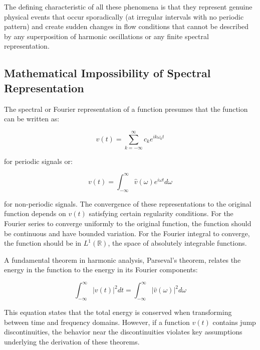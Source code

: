 ﻿\documentclass[a4paper,11pt]{article}
\theoremstyle{definition}
\begin{document}
The defining characteristic of all these phenomena is that they represent genuine physical events that occur sporadically (at irregular intervals with no periodic pattern) and create sudden changes in flow conditions that cannot be described by any superposition of harmonic oscillations or any finite spectral representation.

\subsection{Mathematical Impossibility of Spectral Representation}

The spectral or Fourier representation of a function presumes that the function can be written as:

\begin{equation}
v(t) = \sum_{k=-\infty}^{\infty} c_k e^{i k \omega_0 t}
\label{eq:fourier_series}
\end{equation}

for periodic signals or:

\begin{equation}
v(t) = \int_{-\infty}^{\infty} \hat{v}(\omega) e^{i \omega t} d\omega
\label{eq:fourier_transform}
\end{equation}

for non-periodic signals. The convergence of these representations to the original function depends on $v(t)$ satisfying certain regularity conditions. For the Fourier series to converge uniformly to the original function, the function should be continuous and have bounded variation. For the Fourier integral to converge, the function should be in $L^1(\mathbb{R})$, the space of absolutely integrable functions.

A fundamental theorem in harmonic analysis, Parseval's theorem, relates the energy in the function to the energy in its Fourier components:

\begin{equation}
\int_{-\infty}^{\infty} |v(t)|^2 dt = \int_{-\infty}^{\infty} |\hat{v}(\omega)|^2 d\omega
\label{eq:parseval}
\end{equation}

This equation states that the total energy is conserved when transforming between time and frequency domains. However, if a function $v(t)$ contains jump discontinuities, the behavior near the discontinuities violates key assumptions underlying the derivation of these theorems.
\end{document}
